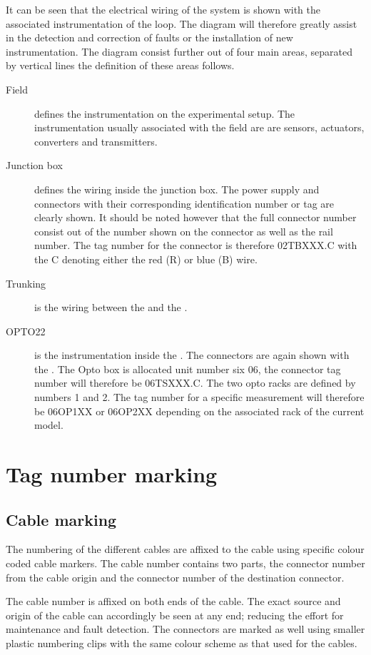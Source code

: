 It can be seen that the electrical wiring of the system is shown with the associated instrumentation of the loop. The diagram will therefore greatly assist in the detection and correction of faults or the installation of new instrumentation. The diagram consist further out of four main areas, separated by vertical lines the definition of these areas follows.
\begin{description}
	\item[Field] defines the instrumentation on the experimental setup. The instrumentation usually associated with the field are are sensors, actuators, converters and transmitters.
	\item[Junction box] defines the wiring inside the junction box. The power supply and connectors with their corresponding identification number or tag are clearly shown. It should be noted however that the full connector number consist out of the number shown on the connector as well as the rail number. The tag number for the connector is therefore 02TBXXX.C with the C denoting either the red (R) or blue (B) wire.
	\item[Trunking] is the wiring between the  and the .
	\item[OPTO22] is the instrumentation inside the . The connectors are again shown with the . The Opto box is allocated unit number six 06, the connector tag number will therefore be 06TSXXX.C. The two opto racks are defined by numbers 1 and 2. The tag number for a specific measurement will therefore be 06OP1XX or 06OP2XX depending on the associated rack of the current model.  
\end{description}

\section{Tag number marking}
\subsection{Cable marking}
The numbering of the different cables are affixed to the cable using specific colour coded cable markers. The cable number contains two parts, the connector number from the cable origin and the connector number of the destination connector. 

The cable number is affixed on both ends of the cable. The exact source and  origin of the cable can accordingly be seen at any end; reducing the effort for maintenance and fault detection. The connectors are marked as well using smaller plastic numbering clips with the same colour scheme as that used for the cables. 

